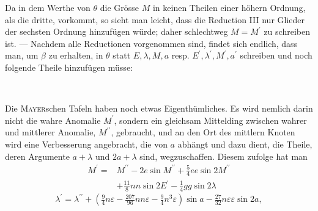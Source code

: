\clearpage
\begingroup
{}
\renewcommand{\headrulewidth}{0pt}
\thispagestyle{VIIPrinted632}
\par\noindent\hspace*{\parindent}Da in dem Werthe von \(\theta\) die Grösse \(M\) in keinen Theilen einer höhern
Ordnung, als die dritte, vorkommt, so sieht man leicht, dass die Reduction
III nur Glieder der sechsten Ordnung hinzufügen würde; daher schlechtweg
\(M=M^{\prime}\) zu schreiben ist. — Nachdem alle Reductionen vorgenommen sind,
findet sich endlich, dass man, um \(\beta\) zu erhalten, in \(\theta\) statt \(E,\lambda,M,a\) resp.
\(E^{\prime},\lambda^{\prime},M^{\prime},a^{\prime}\) schreiben und noch folgende Theile hinzufügen müsse:
\begin{center}
\\[4pt]
\end{center}
\par\noindent\hspace*{\parindent}Die \textsc{Mayer}schen Tafeln haben noch etwas Eigenthümliches. Es wird
nemlich darin nicht die wahre Anomalie \(M^{\prime}\), sondern ein gleichsam Mittelding
zwischen wahrer und mittlerer Anomalie, \(M^{\prime\prime}\), gebraucht, und an den
Ort des mittlern Knoten wird eine Verbesserung angebracht, die von \(a\) abhängt
und dazu dient, die Theile, deren Argumente \(a+\lambda\) und \(2a+\lambda\) sind,
wegzuschaffen. Diesem zufolge hat man
\[
\begin{aligned}
M^{\prime}={}&M^{\prime\prime}-2e\sin M^{\prime\prime}
 +\tfrac54ee\sin2M^{\prime\prime}\\
&+\tfrac{11}{8}nn\sin2E^{\prime}-\tfrac14gg\sin2\lambda
\end{aligned}
\]
\[
\lambda^{\prime}=\lambda^{\prime\prime}
 +\left(\tfrac94n\varepsilon-\tfrac{207}{96}nn\varepsilon
 -\tfrac94n^3\varepsilon\right)\sin a
 -\tfrac{27}{32}n\varepsilon\varepsilon\sin2a,
\]
